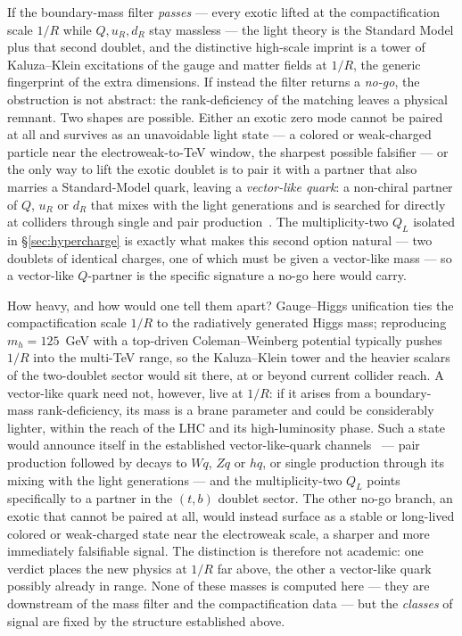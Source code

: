 \documentclass[11pt,a4paper]{article}
\begin{document}
If the boundary-mass filter \emph{passes} --- every exotic lifted at the
compactification scale $1/R$ while $Q,u_R,d_R$ stay massless --- the light theory is the
Standard Model plus that second doublet, and the distinctive high-scale imprint is a
tower of Kaluza--Klein excitations of the gauge and matter fields at $1/R$, the generic
fingerprint of the extra dimensions. If instead the filter returns a \emph{no-go}, the
obstruction is not abstract: the rank-deficiency of the matching leaves a physical
remnant. Two shapes are possible. Either an exotic zero mode cannot be paired at all and
survives as an unavoidable light state --- a colored or weak-charged particle near the
electroweak-to-TeV window, the sharpest possible falsifier --- or the only way to lift
the exotic doublet is to pair it with a partner that also marries a Standard-Model quark,
leaving a \emph{vector-like quark}: a non-chiral partner of $Q$, $u_R$ or $d_R$ that
mixes with the light generations and is searched for directly at colliders through
single and pair production~\cite{VLQ}. The multiplicity-two $Q_L$ isolated in
\S\ref{sec:hypercharge} is exactly what makes this second option natural --- two doublets
of identical charges, one of which must be given a vector-like mass --- so a vector-like
$Q$-partner is the specific signature a no-go here would carry.

How heavy, and how would one tell them apart? Gauge--Higgs unification ties the
compactification scale $1/R$ to the radiatively generated Higgs mass; reproducing
$m_h=125$~GeV with a top-driven Coleman--Weinberg potential typically pushes $1/R$ into
the multi-TeV range, so the Kaluza--Klein tower and the heavier scalars of the
two-doublet sector would sit there, at or beyond current collider reach. A vector-like
quark need not, however, live at $1/R$: if it arises from a boundary-mass
rank-deficiency, its mass is a brane parameter and could be considerably lighter, within
the reach of the LHC and its high-luminosity phase. Such a state would announce itself
in the established vector-like-quark channels~\cite{VLQ} --- pair production followed by
decays to $Wq$, $Zq$ or $hq$, or single production through its mixing with the light
generations --- and the multiplicity-two $Q_L$ points specifically to a partner in the
$(t,b)$ doublet sector. The other no-go branch, an exotic that cannot be paired at all,
would instead surface as a stable or long-lived colored or weak-charged state near the
electroweak scale, a sharper and more immediately falsifiable signal. The distinction is
therefore not academic: one verdict places the new physics at $1/R$ far above, the other
a vector-like quark possibly already in range. None of these masses is computed here ---
they are downstream of the mass filter and the compactification data --- but the
\emph{classes} of signal are fixed by the structure established above.
\end{document}
